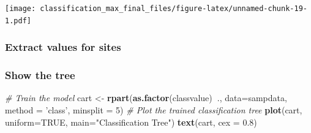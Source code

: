 \documentclass[]{article}
\newenvironment{Shaded}{\begin{snugshade}}{\end{snugshade}}
\newcommand{\CommentTok}[1]{\textcolor[rgb]{0.56,0.35,0.01}{\textit{#1}}}
\newcommand{\DataTypeTok}[1]{\textcolor[rgb]{0.13,0.29,0.53}{#1}}
\newcommand{\DecValTok}[1]{\textcolor[rgb]{0.00,0.00,0.81}{#1}}
\newcommand{\FloatTok}[1]{\textcolor[rgb]{0.00,0.00,0.81}{#1}}
\newcommand{\KeywordTok}[1]{\textcolor[rgb]{0.13,0.29,0.53}{\textbf{#1}}}
\newcommand{\NormalTok}[1]{#1}
\newcommand{\OperatorTok}[1]{\textcolor[rgb]{0.81,0.36,0.00}{\textbf{#1}}}
\newcommand{\OtherTok}[1]{\textcolor[rgb]{0.56,0.35,0.01}{#1}}
\newcommand{\StringTok}[1]{\textcolor[rgb]{0.31,0.60,0.02}{#1}}
\begin{document}
\texttt{[image: classification\_max\_final\_files/figure-latex/unnamed-chunk-19-1.pdf]}

\hypertarget{extract-values-for-sites}{%
\subsubsection{Extract values for
sites}\label{extract-values-for-sites}}

\begin{Shaded}
\end{Shaded}

\hypertarget{show-the-tree}{%
\subsubsection{Show the tree}\label{show-the-tree}}

\begin{Shaded}
\begin{Highlighting}[]
\CommentTok{# Train the model}
\NormalTok{cart <-}\StringTok{ }\KeywordTok{rpart}\NormalTok{(}\KeywordTok{as.factor}\NormalTok{(classvalue)}\OperatorTok{~}\NormalTok{., }\DataTypeTok{data=}\NormalTok{sampdata, }\DataTypeTok{method =} \StringTok{'class'}\NormalTok{, }\DataTypeTok{minsplit =} \DecValTok{5}\NormalTok{)}
\CommentTok{# Plot the trained classification tree}
\KeywordTok{plot}\NormalTok{(cart, }\DataTypeTok{uniform=}\OtherTok{TRUE}\NormalTok{, }\DataTypeTok{main=}\StringTok{"Classification Tree"}\NormalTok{)}
\KeywordTok{text}\NormalTok{(cart, }\DataTypeTok{cex =} \FloatTok{0.8}\NormalTok{)}
\end{Highlighting}
\end{Shaded}
\end{document}
